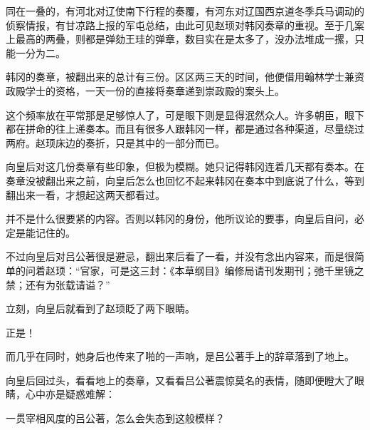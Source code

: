 同在一叠的，有河北对辽使南下行程的奏覆，有河东对辽国西京道冬季兵马调动的侦察情报，有甘凉路上报的军屯总结，由此可见赵顼对韩冈奏章的重视。至于几案上最高的两叠，则都是弹劾王珪的弹章，数目实在是太多了，没办法堆成一摞，只能一分为二。

韩冈的奏章，被翻出来的总计有三份。区区两三天的时间，他便借用翰林学士兼资政殿学士的资格，一天一份的直接将奏章递到崇政殿的案头上。

这个频率放在平常那是足够惊人了，可是眼下则是显得泯然众人。许多朝臣，眼下都在拼命的往上递奏本。而且有很多人跟韩冈一样，都是通过各种渠道，尽量绕过两府。赵顼床边的奏折，只是其中的一部分而已。

向皇后对这几份奏章有些印象，但极为模糊。她只记得韩冈连着几天都有奏本。在奏章没被翻出来之前，向皇后怎么也回忆不起来韩冈在奏本中到底说了什么，等到翻出来一看，才想起这两天都看过。

并不是什么很要紧的内容。否则以韩冈的身份，他所议论的要事，向皇后自问，必定是能记住的。

不过向皇后对吕公著很是避忌，翻出来后看了一看，并没有念出内容来，而是很简单的问着赵顼：“官家，可是这三封：《本草纲目》编修局请刊发期刊；弛千里镜之禁；还有为张载请谥？”

立刻，向皇后就看到了赵顼眨了两下眼睛。

正是！

而几乎在同时，她身后也传来了啪的一声响，是吕公著手上的辞章落到了地上。

向皇后回过头，看看地上的奏章，又看看吕公著震惊莫名的表情，随即便瞪大了眼睛，心中亦是疑惑难解：

一贯宰相风度的吕公著，怎么会失态到这般模样？

